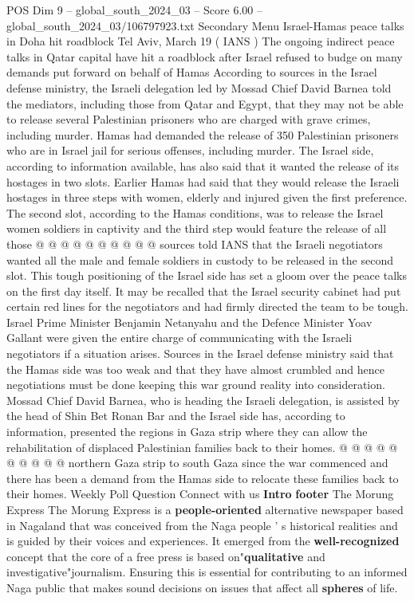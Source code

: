 \begin{textsample}{POS Dim 9 – global\_south\_2024\_03 – Score 6.00 – global\_south\_2024\_03/106797923.txt}  \label{ex:f9_pos_041}
Secondary Menu Israel-Hamas peace talks in Doha hit roadblock Tel Aviv, March 19 ( IANS ) The ongoing indirect peace talks in Qatar capital have hit a roadblock after Israel refused to budge on many demands put forward on behalf of Hamas According to sources in the Israel defense ministry, the Israeli delegation led by Mossad Chief David Barnea told the mediators, including those from Qatar and Egypt, that they may not be able to release several Palestinian prisoners who are charged with grave crimes, including murder.
Hamas had demanded the release of 350 Palestinian prisoners who are in Israel jail for serious offenses, including murder.
The Israel side, according to information available, has also said that it wanted the release of its hostages in two slots.
Earlier Hamas had said that they would release the Israeli hostages in three steps with women, elderly and injured given the first preference.
The second slot, according to the Hamas conditions, was to release the Israel women soldiers in captivity and the third step would feature the release of all those @ @ @ @ @ @ @ @ @ @ sources told IANS that the Israeli negotiators wanted all the male and female soldiers in custody to be released in the second slot.
This tough positioning of the Israel side has set a gloom over the peace talks on the first day itself.
It may be recalled that the Israel security cabinet had put certain red lines for the negotiators and had firmly directed the team to be tough.
Israel Prime Minister Benjamin Netanyahu and the Defence Minister Yoav Gallant were given the entire charge of communicating with the Israeli negotiators if a situation arises.
Sources in the Israel defense ministry said that the Hamas side was too weak and that they have almost crumbled and hence negotiations must be done keeping this war ground reality into consideration.
Mossad Chief David Barnea, who is heading the Israeli delegation, is assisted by the head of Shin Bet Ronan Bar and the Israel side has, according to information, presented the regions in Gaza strip where they can allow the rehabilitation of displaced Palestinian families back to their homes. @ @ @ @ @ @ @ @ @ @ northern Gaza strip to south Gaza since the war commenced and there has been a demand from the Hamas side to relocate these families back to their homes.
Weekly Poll Question Connect with us \textbf{Intro} \textbf{footer} The Morung Express The Morung Express is a \textbf{people-oriented} alternative newspaper based in Nagaland that was conceived from the Naga people ' s historical realities and is guided by their voices and experiences.
It emerged from the \textbf{well-recognized} concept that the core of a free press is based on"\textbf{qualitative} and investigative"journalism.
Ensuring this is essential for contributing to an informed Naga public that makes sound decisions on issues that affect all \textbf{spheres} of life.

\end{textsample}
